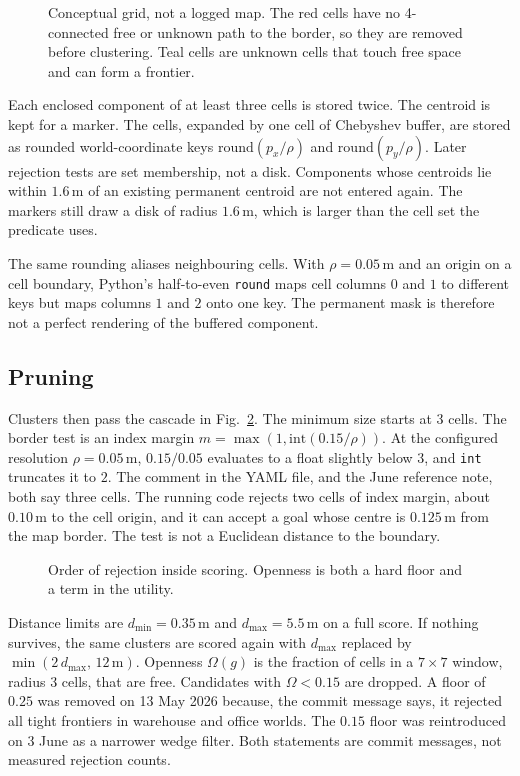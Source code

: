\documentclass[11pt]{article}
\begin{document}
\begin{figure}[ht]
\centering
\FigEnclosed
\caption{Conceptual grid, not a logged map. The red cells have no 4-connected free or unknown path to the border, so they are removed before clustering. Teal cells are unknown cells that touch free space and can form a frontier.}
\label{fig:enc}
\end{figure}

Each enclosed component of at least three cells is stored twice. The centroid is kept for a marker. The cells, expanded by one cell of Chebyshev buffer, are stored as rounded world-coordinate keys $\mathrm{round}(p_x/\rho)$ and $\mathrm{round}(p_y/\rho)$. Later rejection tests are set membership, not a disk. Components whose centroids lie within $1.6$\,m of an existing permanent centroid are not entered again. The markers still draw a disk of radius $1.6$\,m, which is larger than the cell set the predicate uses.

The same rounding aliases neighbouring cells. With $\rho=0.05$\,m and an origin on a cell boundary, Python's half-to-even \texttt{round} maps cell columns $0$ and $1$ to different keys but maps columns $1$ and $2$ onto one key. The permanent mask is therefore not a perfect rendering of the buffered component.

\subsection{Pruning}
Clusters then pass the cascade in Fig.~\ref{fig:prune}. The minimum size starts at $3$ cells. The border test is an index margin $m=\max(1,\mathrm{int}(0.15/\rho))$. At the configured resolution $\rho=0.05$\,m, $0.15/0.05$ evaluates to a float slightly below $3$, and \texttt{int} truncates it to $2$. The comment in the YAML file, and the June reference note, both say three cells. The running code rejects two cells of index margin, about $0.10$\,m to the cell origin, and it can accept a goal whose centre is $0.125$\,m from the map border. The test is not a Euclidean distance to the boundary.

\begin{figure}[ht]
\centering
\FigPrune
\caption{Order of rejection inside scoring. Openness is both a hard floor and a term in the utility.}
\label{fig:prune}
\end{figure}

Distance limits are $d_{\min}=0.35$\,m and $d_{\max}=5.5$\,m on a full score. If nothing survives, the same clusters are scored again with $d_{\max}$ replaced by $\min(2\,d_{\max},\,12\,\mathrm{m})$. Openness $\Omega(g)$ is the fraction of cells in a $7\times 7$ window, radius $3$ cells, that are free. Candidates with $\Omega<0.15$ are dropped. A floor of $0.25$ was removed on 13 May 2026 because, the commit message says, it rejected all tight frontiers in warehouse and office worlds. The $0.15$ floor was reintroduced on 3 June as a narrower wedge filter. Both statements are commit messages, not measured rejection counts.
\end{document}
